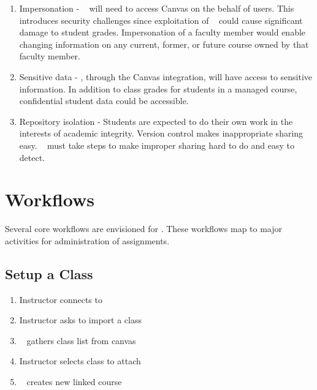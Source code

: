 \begin{enumerate}
\item Impersonation - \acronym~ will need to access Canvas on the behalf of users. This introduces security challenges since exploitation of \acronym~ could cause significant damage to student grades. Impersonation of a faculty member would enable changing information on any current, former, or future course owned by that faculty member.

\item Sensitive data - \acronym, through the Canvas integration, will have access to sensitive information. In addition to class grades for students in a managed course, confidential student data could be accessible.

\item Repository isolation - Students are expected to do their own work in the interests of academic integrity. Version control makes inappropriate sharing easy. \acronym~ must take steps to make improper sharing hard to do and easy to detect.
\end{enumerate}

\section{Workflows}
Several core workflows are envisioned for \acronym.
These workflows map to major activities for administration of assignments.

\subsection{Setup a Class}
\label{wf_class_setup}
\begin{enumerate}
\item Instructor connects to \acronym
\item Instructor asks to import a class
\item \acronym~ gathers class list from canvas
\item Instructor selects class to attach
\item \acronym~ creates new linked course
\end{enumerate}

